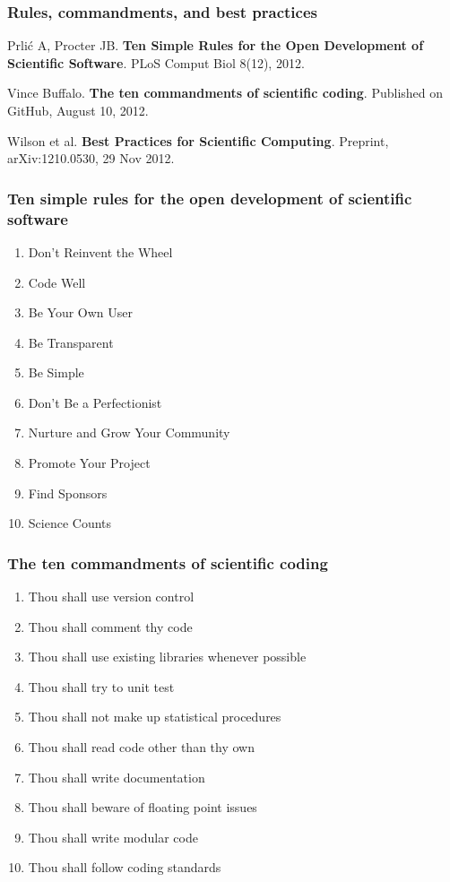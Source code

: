 \documentclass[slidestop]{beamer}
\begin{document}
\begin{frame}
  \frametitle{Rules, commandments, and best practices}
  Prli\'c A, Procter JB. {\bf Ten Simple Rules for the Open Development of
    Scientific Software}. PLoS Comput Biol 8(12), 2012.

  \vspace{0.5cm}

  Vince Buffalo. {\bf The ten commandments of scientific coding}. Published on
  GitHub, August 10, 2012.

  \vspace{0.5cm}

  Wilson et al. {\bf Best Practices for Scientific Computing}. Preprint,
  arXiv:1210.0530, 29 Nov 2012.
\end{frame}

\begin{frame}
  \frametitle{Ten simple rules for the open development of scientific
    software}
  \begin{enumerate}
    \item Don't Reinvent the Wheel
    \item Code Well
    \item Be Your Own User
    \item Be Transparent
    \item Be Simple
    \item Don't Be a Perfectionist
    \item Nurture and Grow Your Community
    \item Promote Your Project
    \item Find Sponsors
    \item Science Counts
  \end{enumerate}
\end{frame}


\begin{frame}
  \frametitle{The ten commandments of scientific coding}
  \begin{enumerate}
    \item Thou shall use version control
    \item Thou shall comment thy code
    \item Thou shall use existing libraries whenever possible
    \item Thou shall try to unit test
    \item Thou shall not make up statistical procedures
    \item Thou shall read code other than thy own
    \item Thou shall write documentation
    \item Thou shall beware of floating point issues
    \item Thou shall write modular code
    \item Thou shall follow coding standards
  \end{enumerate}
\end{frame}
\end{document}

